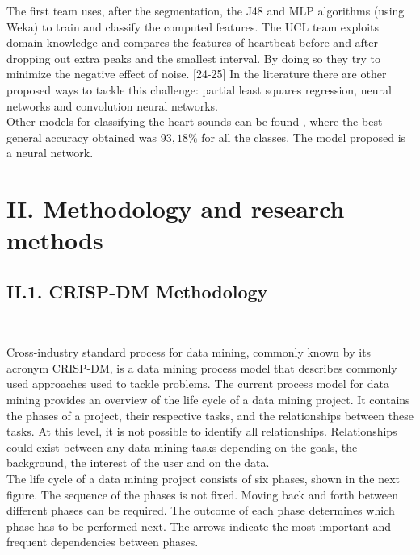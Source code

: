 \documentclass[11pt, a4papper]{report}
\theoremstyle{plain}
\theoremstyle{definition}
\theoremstyle{definition}
\theoremstyle{proposition}
\begin{document}
The first team uses, after the segmentation, the J48 and MLP algorithms (using Weka) to train and classify the computed features. The UCL team exploits domain knowledge and compares the features of heartbeat before and after dropping out extra peaks and the smallest interval. By doing so they try to minimize the negative effect of noise. [24-25] In the literature there are other proposed ways to tackle this challenge: partial least squares regression, neural networks and convolution neural networks.
\\

Other models for classifying the heart sounds can be found \cite{27}, where the best general accuracy obtained was $93,18 \%$ for all the classes. The model proposed is a neural network.


\newpage



\chapter*{II. Methodology and research methods}

\section*{II.1. CRISP-DM Methodology}
\

Cross-industry standard process for data mining, commonly known by its acronym CRISP-DM, is a data mining process model that describes commonly used approaches used to tackle problems. The current process model for data mining provides an overview of the life cycle of a data mining project. It contains the phases of a project, their respective tasks, and the relationships between these tasks. At this level, it is not possible to identify all relationships. Relationships could exist between any data mining tasks depending on the goals, the background, the interest of the user and on the data. \cite{12}
\\

The life cycle of a data mining project consists of six phases, shown in the next figure. The sequence of the phases is not fixed. Moving back and forth between different phases can be required. The outcome of each phase determines which phase has to be performed next. The arrows indicate the most important and frequent dependencies between phases.
\\
\end{document}
